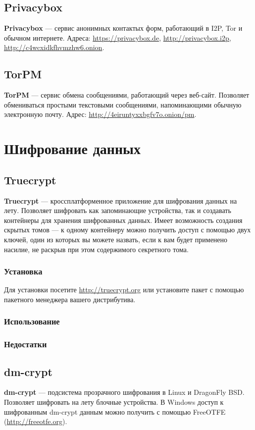 \subsection{Privacybox}
\textbf{Privacybox} --- сервис анонимных контактых форм, работающий в I2P, Tor и обычном интернете. Адреса: \url{https://privacybox.de}, \url{http://privacybox.i2p}, \url{http://c4wcxidkfhvmzhw6.onion}.
\subsection{TorPM}
\textbf{TorPM} --- сервис обмена сообщениями, работающий через веб-сайт. Позволяет обмениваться простыми текстовыми сообщениями, напоминающими обычную электронную почту. Адрес: \url{http://4eiruntyxxbgfv7o.onion/pm}.

\section{Шифрование данных}
\subsection{Truecrypt}
\textbf{Truecrypt} --- кроссплатформенное приложение для шифрования данных на лету. Позволяет шифровать как запоминающие устройства, так и создавать контейнеры для хранения шифрованных данных. Имеет возможность создания скрытых томов --- к одному контейнеру можно получить доступ с помощью двух ключей, один из которых вы можете назвать, если к вам будет применено насилие, не раскрыв при этом содержимого секретного тома.
\subsubsection{Установка}
Для установки посетите \url{http://truecrypt.org} или установите пакет с помощью пакетного менеджера вашего дистрибутива.
\subsubsection{Использование}
\subsubsection{Недостатки}
\subsection{dm-crypt}
\textbf{dm-crypt} --- подсистема прозрачного шифрования в Linux и DragonFly BSD. Позволяет шифровать на лету блочные устройства. В Windows доступ к шифрованным dm-crypt данным можно получить с помощью FreeOTFE (\url{http://freeotfe.org}).
